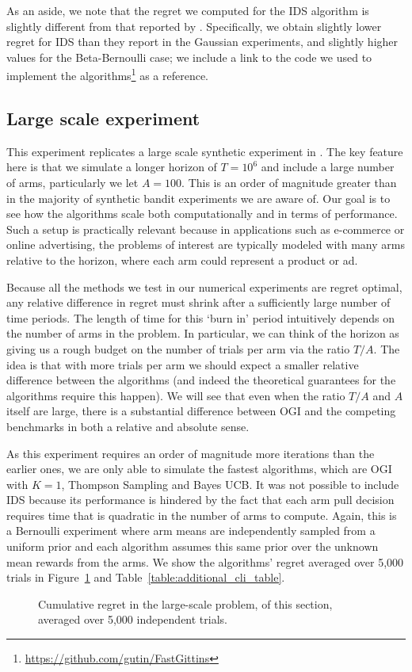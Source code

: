 As an aside, we note that the regret we computed for the IDS algorithm is slightly different from that reported by \cite{russo2014learning}. Specifically, we obtain slightly lower regret for IDS than they report in the Gaussian experiments, and slightly higher values for the Beta-Bernoulli case; we include a link to the code we used to implement the algorithms\footnote{\url{https://github.com/gutin/FastGittins}} as a reference.  

\subsection{Large scale experiment} \label{exp:ts_sampling_experiment}
This experiment replicates a large scale synthetic experiment in \cite{chapelle2011empirical}.
The key feature here is that we simulate a  longer horizon of $T = 10^6$ and include a large number of arms, particularly we let $A = 100$. This is an order of magnitude greater than in the majority of synthetic bandit experiments we are aware of.
Our goal is to see how the algorithms scale both computationally and in terms of performance.
Such a setup is practically relevant because in applications such as e-commerce or online advertising, the problems of interest are typically modeled with many arms relative to the horizon, where each arm could represent a product or ad.

Because all the methods we test in our numerical experiments are regret optimal, any relative difference in regret must shrink after a sufficiently large number of time periods. The length of time for this `burn in' period intuitively depends on the number of arms in the problem.
In particular, we can think of the horizon as giving us a rough budget on the number of trials per arm via the ratio $T/A$.
The idea is that with more trials per arm we should expect a smaller relative difference between the algorithms (and indeed the theoretical guarantees for the algorithms require this happen). 
We will see that even when the ratio $T/A$ and $A$ itself are large, there is a substantial difference between OGI and the competing benchmarks in both a relative and absolute sense.

As this experiment requires an order of magnitude more iterations than the earlier ones, we are only able to simulate the fastest algorithms, which are OGI with $K=1$, Thompson Sampling and Bayes UCB. 
It was not possible to include IDS because its performance is hindered by the fact that each arm pull decision requires time that is quadratic in the number of arms to compute. 
Again, this is a Bernoulli experiment where arm means are independently sampled from a uniform prior and each algorithm assumes this same prior over the unknown mean rewards from the arms.
We show the algorithms' regret averaged over 5,000 trials in Figure~\ref{fig:chapelle_and_li} and Table~\ref{table:additional_cli_table}.
\begin{figure}[h!]
	\centering
	
	\caption{Cumulative regret in the large-scale problem, of this section, averaged over 5,000 independent trials.}
	\label{fig:chapelle_and_li}
\end{figure}

